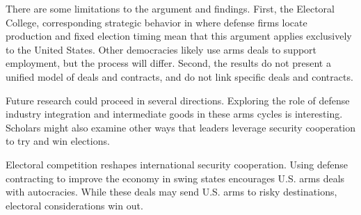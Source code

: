 \documentclass[12pt]{article}
\begin{document}
There are some limitations to the argument and findings.
First, the Electoral College, corresponding strategic behavior in where defense firms locate production and fixed election timing mean that this argument applies exclusively to the United States.
Other democracies likely use arms deals to support employment, but the process will differ. 
Second, the results do not present a unified model of deals and contracts, and do not link specific deals and contracts. 


Future research could proceed in several directions. 
Exploring the role of defense industry integration and intermediate goods in these arms cycles is interesting.
Scholars might also examine other ways that leaders leverage security cooperation to try and win elections. 


Electoral competition reshapes international security cooperation.
Using defense contracting to improve the economy in swing states encourages U.S. arms deals with autocracies.
While these deals may send U.S. arms to risky destinations, electoral considerations win out. 


\newpage
\singlespace
 
 
\end{document}
